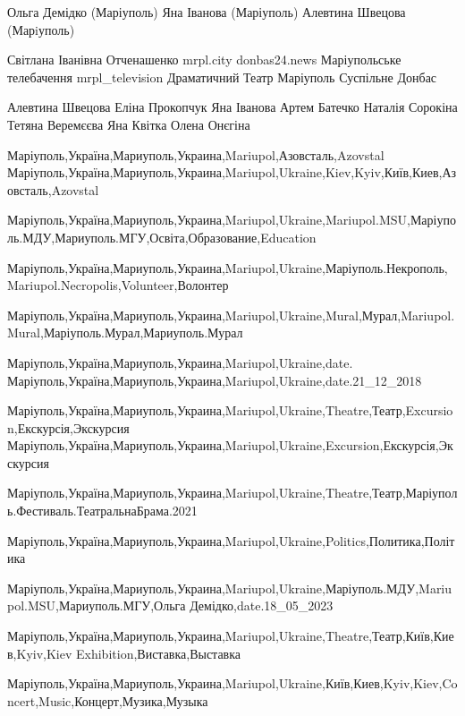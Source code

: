  
 
 
 
 

Ольга Демідко (Маріуполь)
Яна Іванова (Маріуполь)
Алевтина Швецова (Марiуполь)

Світлана Іванівна Отченашенко
mrpl.city
donbas24.news
Маріупольське телебачення mrpl_television
Драматичний Театр Маріуполь
Суспільне Донбас

Алевтина Швецова
Еліна Прокопчук
Яна Іванова
Артем Батечко
Наталія Сорокіна
Тетяна Веремєєва
Яна Квітка
Олена Онєгіна

Маріуполь,Україна,Мариуполь,Украина,Mariupol,Азовсталь,Azovstal
Маріуполь,Україна,Мариуполь,Украина,Mariupol,Ukraine,Kiev,Kyiv,Київ,Киев,Азовсталь,Azovstal

Маріуполь,Україна,Мариуполь,Украина,Mariupol,Ukraine,Mariupol.MSU,Маріуполь.МДУ,Мариуполь.МГУ,Освіта,Образование,Education

Маріуполь,Україна,Мариуполь,Украина,Mariupol,Ukraine,Маріуполь.Некрополь,Mariupol.Necropolis,Volunteer,Волонтер

Маріуполь,Україна,Мариуполь,Украина,Mariupol,Ukraine,Mural,Мурал,Mariupol.Mural,Маріуполь.Мурал,Мариуполь.Мурал

Маріуполь,Україна,Мариуполь,Украина,Mariupol,Ukraine,date.
Маріуполь,Україна,Мариуполь,Украина,Mariupol,Ukraine,date.21_12_2018

Маріуполь,Україна,Мариуполь,Украина,Mariupol,Ukraine,Theatre,Театр,Excursion,Екскурсія,Экскурсия
Маріуполь,Україна,Мариуполь,Украина,Mariupol,Ukraine,Excursion,Екскурсія,Экскурсия

Маріуполь,Україна,Мариуполь,Украина,Mariupol,Ukraine,Theatre,Театр,Маріуполь.Фестиваль.ТеатральнаБрама.2021

Маріуполь,Україна,Мариуполь,Украина,Mariupol,Ukraine,Politics,Политика,Політика

Маріуполь,Україна,Мариуполь,Украина,Mariupol,Ukraine,Маріуполь.МДУ,Mariupol.MSU,Мариуполь.МГУ,Ольга Демідко,date.18_05_2023

Маріуполь,Україна,Мариуполь,Украина,Mariupol,Ukraine,Theatre,Театр,Київ,Киев,Kyiv,Kiev
Exhibition,Виставка,Выставка

Маріуполь,Україна,Мариуполь,Украина,Mariupol,Ukraine,Київ,Киев,Kyiv,Kiev,Concert,Music,Концерт,Музика,Музыка

